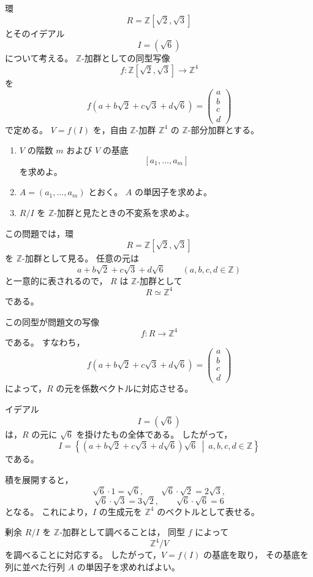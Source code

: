 
\begin{exercise}
	環
	\[
	R=\mathbb{Z}[\sqrt{2},\sqrt{3}]
	\]
	とそのイデアル
	\[
	I=(\sqrt{6})
	\]
	について考える。
	\(\mathbb{Z}\)-加群としての同型写像
	\[
	f:\mathbb{Z}[\sqrt{2},\sqrt{3}]
	\longrightarrow
	\mathbb{Z}^4
	\]
	を
	\[
	f(a+b\sqrt{2}+c\sqrt{3}+d\sqrt{6})
	=
	\begin{pmatrix}
		a\\
		b\\
		c\\
		d
	\end{pmatrix}
	\]
	で定める。
	\(V=f(I)\) を，自由 \(\mathbb{Z}\)-加群 \(\mathbb{Z}^4\) の
	\(\mathbb{Z}\)-部分加群とする。
	
	\begin{enumerate}
		\item
		\(V\) の階数 \(m\) および \(V\) の基底
		\[
		[a_1,\ldots,a_m]
		\]
		を求めよ。
		
		\item
		\(A=(a_1,\ldots,a_m)\) とおく。
		\(A\) の単因子を求めよ。
		
		\item
		\(R/I\) を \(\mathbb{Z}\)-加群と見たときの不変系を求めよ。
	\end{enumerate}
\end{exercise}

\begin{background}
	この問題では，環
	\[
	R=\mathbb{Z}[\sqrt{2},\sqrt{3}]
	\]
	を \(\mathbb{Z}\)-加群として見る。
	任意の元は
	\[
	a+b\sqrt{2}+c\sqrt{3}+d\sqrt{6}
	\qquad
	(a,b,c,d\in\mathbb{Z})
	\]
	と一意的に表されるので，
	\(R\) は \(\mathbb{Z}\)-加群として
	\[
	R\simeq \mathbb{Z}^4
	\]
	である。
	
	この同型が問題文の写像
	\[
	f:R\to\mathbb{Z}^4
	\]
	である。
	すなわち，
	\[
	f(a+b\sqrt{2}+c\sqrt{3}+d\sqrt{6})
	=
	\begin{pmatrix}
		a\\
		b\\
		c\\
		d
	\end{pmatrix}
	\]
	によって，\(R\) の元を係数ベクトルに対応させる。
	
	イデアル
	\[
	I=(\sqrt{6})
	\]
	は，\(R\) の元に \(\sqrt{6}\) を掛けたもの全体である。
	したがって，
	\[
	I=
	\left\{
	(a+b\sqrt{2}+c\sqrt{3}+d\sqrt{6})\sqrt{6}
	\ \middle|\ 
	a,b,c,d\in\mathbb{Z}
	\right\}
	\]
	である。
	
	積を展開すると，
	\[
	\sqrt{6}\cdot 1=\sqrt{6},
	\qquad
	\sqrt{6}\cdot \sqrt{2}=2\sqrt{3},
	\]
	\[
	\sqrt{6}\cdot \sqrt{3}=3\sqrt{2},
	\qquad
	\sqrt{6}\cdot \sqrt{6}=6
	\]
	となる。
	これにより，\(I\) の生成元を \(\mathbb{Z}^4\) のベクトルとして表せる。
	
	剰余 \(R/I\) を \(\mathbb{Z}\)-加群として調べることは，
	同型 \(f\) によって
	\[
	\mathbb{Z}^4/V
	\]
	を調べることに対応する。
	したがって，\(V=f(I)\) の基底を取り，
	その基底を列に並べた行列 \(A\) の単因子を求めればよい。
\end{background}


